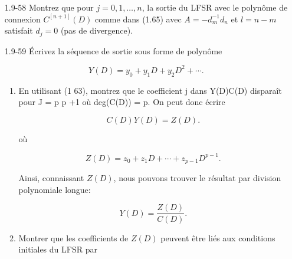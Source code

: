 \documentclass[10pt,twoside,a4paper]{book}
\begin{document}
\begin{enumerate}
  \item[1.9-58] Montrez que pour $j=0,1,\ldots,n$, la sortie du LFSR avec le polynôme de connexion $C^{[n+1]}(D)$ comme dans (1.65) avec $A=-d_m^{-1}d_n$ et $l=n-m$ satisfait $d_j = 0$ (pas de divergence).
  

  \item[1.9-59] Écrivez la séquence de sortie sous forme de polynôme
  
  \begin{equation*}
    Y(D)=y_0+y_1D+y_2 D^2 + \cdots .
  \end{equation*}

  \begin{enumerate}
    \item En utilisant (1 63), montrez que le coefficient j dans Y(D)C(D) disparaît pour J = p p +1 où deg(C(D)) = p. On peut donc écrire
    
    \begin{equation*}
      C(D)Y(D)=Z(D).
    \end{equation*}

    où

    \begin{equation*}
      Z(D)=z_0+z_1D+ \cdots +z_{p-1}D^{p-1}.
    \end{equation*}

    \noindent
    Ainsi, connaissant $Z(D)$, nous pouvons trouver le résultat par division polynomiale longue:

    \begin{equation}
      Y(D)= \frac{Z(D)}{C(D)}.
    \end{equation}

    \item Montrer que les coefficients de $Z(D)$ peuvent être liés aux conditions initiales du LFSR par
    

\end{enumerate}
\end{enumerate}
\end{document}
